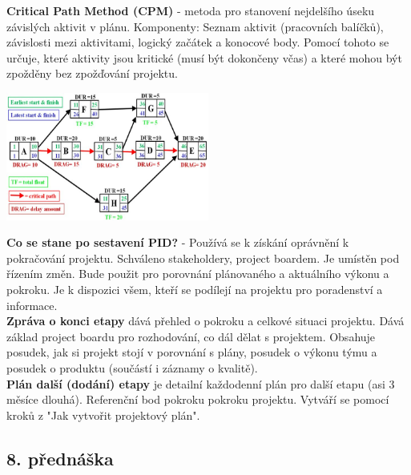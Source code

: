 \documentclass[11pt,a4paper]{article}
\begin{document}
        \textbf{Critical Path Method (CPM)} - metoda pro stanovení nejdelšího úseku závislých aktivit v plánu. Komponenty: Seznam aktivit (pracovních balíčků), závislosti mezi aktivitami, logický začátek a konocové body. Pomocí tohoto se určuje, které aktivity jsou kritické (musí být dokončeny včas) a které mohou být zpožděny bez zpožďování projektu.
       \begin{center}
            \includegraphics[width=0.5\textwidth]{CPM.jpg}
        \end{center}
        \textbf{Co se stane po sestavení PID?} - Používá se k získání oprávnění k pokračování projektu. Schváleno stakeholdery, project boardem. Je umístěn pod řízením změn. Bude použit pro porovnání plánovaného a aktuálního výkonu a pokroku. Je k dispozici všem, kteří se podílejí na projektu pro poradenství a informace.\\
        \textbf{Zpráva o konci etapy} dává přehled o pokroku a celkové situaci projektu. Dává základ project boardu pro rozhodování, co dál dělat s projektem. Obsahuje posudek, jak si projekt stojí v porovnání s plány, posudek o výkonu týmu a posudek o produktu (součástí i záznamy o kvalitě).\\
        \textbf{Plán další (dodání) etapy} je detailní každodenní plán pro další etapu (asi 3 měsíce dlouhá). Referenční bod pokroku pokroku projektu. Vytváří se pomocí kroků z "Jak vytvořit projektový plán".
    \subsection{8. přednáška}
\end{document}
